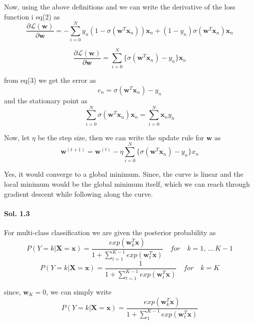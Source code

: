\documentclass[]{report}
\begin{document}
		Now, using the above definitions and we can write the derivative of the loss function i eq(2) as
		\[ \frac{\partial{\mathcal{L}(\textbf{w})}}{\partial{\textbf{w}}} = - \sum_{i = 0}^{N} y_n ({ 1 - \sigma(\textbf{w}^T \textbf{x}_n)})\textbf{x}_n + (1-y_n){\sigma(\textbf{w}^T \textbf{x}_n)}\textbf{x}_n \]
		
		\begin{equation}
			\frac{\partial{\mathcal{L}(\textbf{w})}}{\partial{\textbf{w}}}= \sum_{i = 0}^{N} \{ \sigma(\textbf{w}^T \textbf{x}_n) -y_n \}\textbf{x}_n
		\end{equation}
		
		from eq(3) we get the error as 
		\[ e_n = {\sigma(\textbf{w}^T \textbf{x}_n ) - y_n} \]
		and the stationary point as 
		\[ \sum_{i = 0}^{N} \sigma(\textbf{w}^T \textbf{x}_n ) \textbf{x}_n =  \sum_{i = 0}^{N} \textbf{x}_n y_n \]

		Now, let $\eta$ be the step size, then we can write the update rule for $\textbf{w}$ as
		\begin{equation}
			\textbf{w}^{(t + 1)}  = \textbf{w}^{(t)} - \eta \sum_{i = 0}^{N} \{ \sigma(\textbf{w}^T \textbf{x}_n) - y_n\}x_n
		\end{equation}

		Yes, it would converge to a global minimum. Since, the curve is linear and the local minimum would be the global minimum itself, which we can reach through gradient descent while following along the curve.

	\paragraph{Sol. 1.3}
		For multi-class classification we are given the posterior probability as
		\begin{equation}
			 P(Y = k | \textbf{X} = \textbf{x}) = \frac{exp(\textbf{w}_k^T \textbf{x})}{ 1 + \sum_{t=1}^{K-1} exp(\textbf{w}_t^T \textbf{x})} \quad for \quad k = 1,\, ...\, {K-1}
		\end{equation}
		\begin{equation}
			P(Y = k | \textbf{X} = \textbf{x}) = \frac{1}{ 1 + \sum_{t=1}^{K-1} exp(\textbf{w}_t^T \textbf{x})} \quad for \quad k = K
		\end{equation}
		
		since, $\textbf{w}_K = 0$, we can simply write 
		\begin{equation}
			P(Y = k | \textbf{X} = \textbf{x}) = \frac{exp(\textbf{w}_k^T \textbf{x})}{1 + \sum_1^{K-1} exp(\textbf{w}_t^T \textbf{x})} 
		\end{equation}
\end{document}
